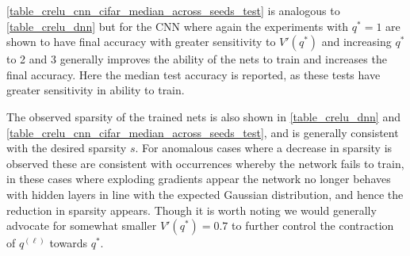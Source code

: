 \documentclass{article}
\theoremstyle{plain}
\theoremstyle{definition}
\theoremstyle{remark}
\begin{document}
\cref{table_crelu_cnn_cifar_median_across_seeds_test} is analogous to  \cref{table_crelu_dnn}  but for the CNN where again the experiments with $q^*=1$ are shown to have final accuracy with greater sensitivity to $V'(q^*)$ and increasing $q^*$ to 2 and 3 generally improves the ability of the nets to train and increases the final accuracy. Here the median test accuracy is reported, as these tests have greater sensitivity in ability to train.  

The observed sparsity of the trained nets is also shown in \cref{table_crelu_dnn} and \cref{table_crelu_cnn_cifar_median_across_seeds_test}, and is generally consistent with the desired sparsity $s$. For anomalous cases where a decrease in sparsity is observed these are consistent with occurrences whereby the network fails to train, in these cases where exploding gradients appear the network no longer behaves with hidden layers in line with the expected Gaussian distribution, and hence the reduction in sparsity appears. Though it is worth noting we would generally advocate for somewhat smaller $V'(q^*)=0.7$ to further control the contraction of $q^{(\ell)}$ towards $q^*$. 
\end{document}
